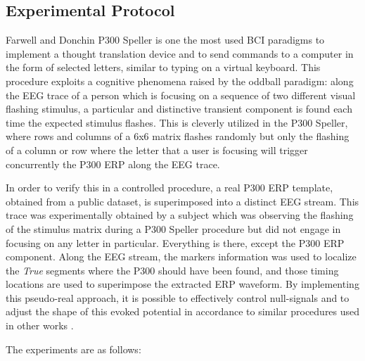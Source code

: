 \documentclass[brainsci,article,submit,moreauthors,pdftex,10pt,a4paper]{mdpi}
\begin{document}


\subsection{Experimental Protocol}
\label{Experimental}

Farwell and Donchin P300 Speller \citep{Farwell1988,Rakotomamonjy2008} is one the most used BCI paradigms to implement a thought translation device and to send commands to a computer in the form of selected letters, similar to typing on a virtual keyboard.  This procedure exploits a cognitive phenomena raised by the oddball paradigm: along the EEG trace of a person which is focusing on a sequence of two different visual flashing stimulus, a particular and distinctive transient component is found each time the expected stimulus flashes.  This is cleverly utilized in the P300 Speller, where rows and columns of a 6x6 matrix flashes randomly but only the flashing of a column or row where the letter that a user is focusing will trigger concurrently the P300 ERP along the EEG trace.

In order to verify this in a controlled procedure, a real P300 ERP template, obtained from a public dataset, is superimposed into a distinct EEG stream.  This trace was experimentally obtained by a subject which was observing the flashing of the stimulus matrix during a P300 Speller procedure but did not engage in focusing on any letter in particular. Everything is there, except the P300 ERP component. Along the EEG stream, the markers information was used to localize the \textit{True} segments where the P300 should have been found, and those timing locations are used to superimpose the extracted ERP waveform.  By implementing this pseudo-real approach, it is possible to effectively control null-signals and to adjust the shape of this evoked potential in accordance to similar procedures used in other works \citep{Ouyang2017,Jaskowski2000,QuianQuiroga2003}.

The experiments are as follows:
\end{document}
